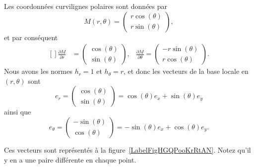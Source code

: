 Les coordonnées curvilignes polaires sont données par
\begin{equation}
	M(r,\theta)=\begin{pmatrix}
		r\cos(\theta) \\
		r\sin(\theta)
	\end{pmatrix},
\end{equation}
et par conséquent
\begin{equation}
	\begin{aligned}[]
		\frac{ \partial M }{ \partial r } & =\begin{pmatrix}
			                                     \cos(\theta) \\
			                                     \sin(\theta)
		                                     \end{pmatrix}, & \frac{ \partial M }{ \partial \theta }=\begin{pmatrix}
			                                                                                             -r\sin(\theta) \\
			                                                                                             r\cos(\theta)
		                                                                                             \end{pmatrix}.
	\end{aligned}
\end{equation}
Nous avons les normes \( h_r=1\) et \( h_{\theta}=r\), et donc les vecteurs de la base locale en \( (r,\theta)\) sont
\begin{equation}
	e_r=\begin{pmatrix}
		\cos(\theta) \\
		\sin(\theta)
	\end{pmatrix}=\cos(\theta)e_x+\sin(\theta)e_y
\end{equation}
ainsi que
\begin{equation}
	e_{\theta}=\begin{pmatrix}
		-\sin(\theta) \\
		\cos(\theta)
	\end{pmatrix}=-\sin(\theta)e_x+\cos(\theta)e_y.
\end{equation}


Ces vecteurs sont représentés à la figure~\ref{LabelFigHGQPooKrRtAN}. Notez qu'il y en a une paire différente en chaque point.
\newcommand{\CaptionFigHGQPooKrRtAN}{En brun, les lignes que le point suivrait si on ne variait qu'une coordonnées polaires à la fois. Les vecteurs rouges sont les vecteurs \( e_{r}\) et \( e_{\theta}\).}


